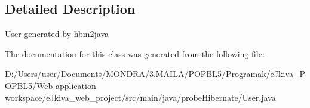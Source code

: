 \subsection{Detailed Description}
\mbox{\hyperlink{classprobe_hibernate_1_1_user}{User}} generated by hbm2java 

The documentation for this class was generated from the following file\+:\begin{DoxyCompactItemize}
\item 
D\+:/\+Users/user/\+Documents/\+M\+O\+N\+D\+R\+A/3.\+M\+A\+I\+L\+A/\+P\+O\+P\+B\+L5/\+Programak/e\+Jkiva\+\_\+\+P\+O\+P\+B\+L5/\+Web application workspace/e\+Jkiva\+\_\+web\+\_\+project/src/main/java/probe\+Hibernate/User.\+java\end{DoxyCompactItemize}
